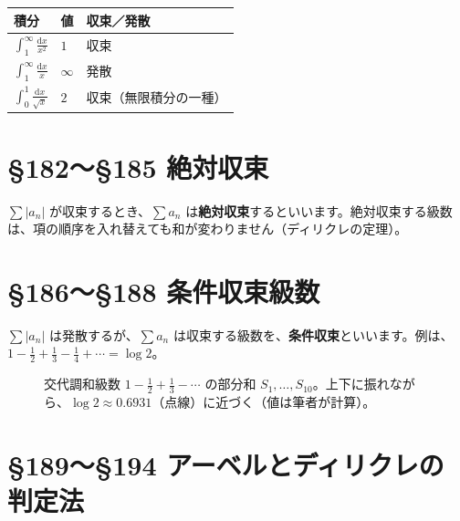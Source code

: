 \documentclass[a4paper,11pt,openany]{ltjsbook}
\newcommand{\dd}{\mathrm{d}}
\begin{document}
\begin{center}
\begin{tabular}{lll}
\toprule
積分 & 値 & 収束／発散\\
\midrule
$\displaystyle\int_1^\infty\frac{\dd x}{x^2}$ & $1$ & 収束\\
$\displaystyle\int_1^\infty\frac{\dd x}{x}$ & $\infty$ & 発散\\
$\displaystyle\int_0^1\frac{\dd x}{\sqrt x}$ & $2$ & 収束（無限積分の一種）\\
\bottomrule
\end{tabular}
\end{center}

\section{§182〜§185 絶対収束}

$\sum|a_n|$ が収束するとき、$\sum a_n$ は\textbf{絶対収束}するといいます。絶対収束する級数は、項の順序を入れ替えても和が変わりません（ディリクレの定理）。

\section{§186〜§188 条件収束級数}

$\sum|a_n|$ は発散するが、$\sum a_n$ は収束する級数を、\textbf{条件収束}といいます。例は、$1-\frac12+\frac13-\frac14+\cdots=\log2$。

\begin{figure}[htbp]
\centering
{}
\caption{交代調和級数 $1-\frac12+\frac13-\cdots$ の部分和 $S_1,\ldots,S_{10}$。上下に振れながら、$\log2\approx0.6931$（点線）に近づく（値は筆者が計算）。}
\end{figure}

\section{§189〜§194 アーベルとディリクレの判定法}
\end{document}
